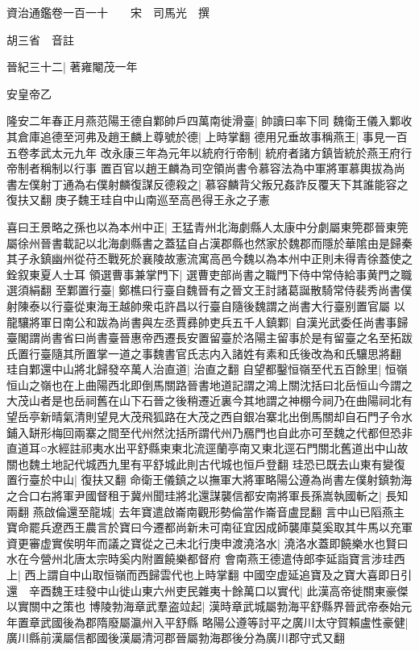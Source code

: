 資治通鑑卷一百一十　　宋　司馬光　撰

胡三省　音註

晉紀三十二|{
	著雍閹茂一年}


安皇帝乙

隆安二年春正月燕范陽王德自鄴帥戶四萬南徙滑臺|{
	帥讀曰率下同}
魏衛王儀入鄴收其倉庫追德至河弗及趙王麟上尊號於德|{
	上時掌翻}
德用兄垂故事稱燕王|{
	事見一百五卷孝武太元九年}
改永康三年為元年以統府行帝制|{
	統府者諸方鎮皆統於燕王府行帝制者稱制以行事}
置百官以趙王麟為司空領尚書令慕容法為中軍將軍慕輿拔為尚書左僕射丁通為右僕射麟復謀反德殺之|{
	慕容麟背父叛兄姦詐反覆天下其誰能容之復扶又翻}
庚子魏王珪自中山南巡至高邑得王永之子憲

喜曰王景略之孫也以為本州中正|{
	王猛青州北海劇縣人太康中分劇屬東筦郡晉東筦屬徐州晉書載記以北海劇縣書之蓋猛自占漢郡縣也然家於魏郡而隱於華隂由是歸秦其子永鎮幽州從苻丕戰死於襄陵故憲流寓高邑今魏以為本州中正則未得青徐蓋使之銓叙東夏人士耳}
領選曹事兼掌門下|{
	選曹吏部尚書之職門下侍中常侍給事黄門之職選須絹翻}
至鄴置行臺|{
	鄭樵曰行臺自魏晉有之晉文王討諸葛誕散騎常侍裴秀尚書僕射陳泰以行臺從東海王越帥衆屯許昌以行臺自隨後魏謂之尚書大行臺别置官屬}
以龍驤將軍日南公和跋為尚書與左丞賈彞帥吏兵五千人鎮鄴|{
	自漢光武委任尚書事歸臺閣謂尚書省曰尚書臺晉惠帝西遷長安置留臺於洛陽主留事於是有留臺之名至拓跋氏置行臺隨其所置掌一道之事魏書官氏志内入諸姓有素和氏後改為和氏驤思將翻}
珪自鄴還中山將北歸發卒萬人治直道|{
	治直之翻}
自望都鑿恒嶺至代五百餘里|{
	恒嶺恒山之嶺也在上曲陽西北即倒馬關路晉書地道記謂之鴻上關沈括曰北岳恒山今謂之大茂山者是也岳祠舊在山下石晉之後稍遷近裏今其地謂之神棚今祠乃在曲陽祠北有望岳亭新晴氣清則望見大茂飛狐路在大茂之西自銀冶寨北出倒馬關却自石門子令水鋪入缾形梅回兩寨之間至代州然沈括所謂代州乃鴈門也自此亦可至魏之代都但恐非直道耳○水經註祁夷水出平舒縣柬東北流逕蘭亭南又東北逕石門關北舊道出中山故關也魏土地記代城西九里有平舒城此則古代城也恒戶登翻}
珪恐已既去山東有變復置行臺於中山|{
	復扶又翻}
命衛王儀鎮之以撫軍大將軍略陽公遵為尚書左僕射鎮勃海之合口右將軍尹國督租于冀州聞珪將北還謀襲信都安南將軍長孫嵩執國斬之|{
	長知兩翻}
燕啟倫還至龍城|{
	去年寶遣啟崙南觀形勢倫當作崙音盧昆翻}
言中山已䧟燕主寶命罷兵遼西王農言於寶曰今遷都尚新未可南征宜因成師襲庫莫奚取其牛馬以充軍資更審虚實俟明年而議之寶從之己未北行庚申渡澆洛水|{
	澆洛水蓋即饒樂水也賢曰水在今營州北唐太宗時奚内附置饒樂都督府}
會南燕王德遣侍郎李延詣寶言涉珪西上|{
	西上謂自中山取恒嶺而西歸雲代也上時掌翻}
中國空虚延追寶及之寶大喜即日引還　辛酉魏王珪發中山徙山東六州吏民雜夷十餘萬口以實代|{
	此漢高帝徙關東豪傑以實關中之策也}
博陵勃海章武羣盗竝起|{
	漢時章武城屬勃海平舒縣界晉武帝泰始元年置章武國後為郡隋廢屬瀛州入平舒縣}
略陽公遵等討平之廣川太守賀賴盧性豪健|{
	廣川縣前漢屬信都國後漢屬清河郡晉屬勃海郡後分為廣川郡守式又翻}
